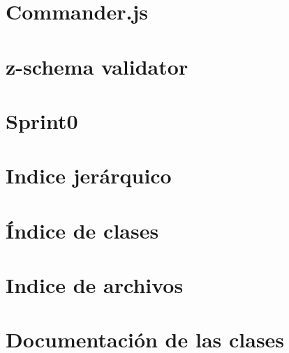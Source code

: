 \documentclass[twoside]{book}
\newcommand{\+}{\discretionary{\mbox{\scriptsize$\hookleftarrow$}}{}{}}
\begin{document}
\chapter{Commander.\+js}
\label{md_Backend_nodejs_node_modules_z_schema_node_modules_commander_Readme}

\chapter{z-\/schema validator}
\label{md_Backend_nodejs_node_modules_z_schema_README}

\chapter{Sprint0}
\label{md_Backend_README}

\chapter{Indice jerárquico}

\chapter{Índice de clases}

\chapter{Indice de archivos}

\chapter{Documentación de las clases}
















\end{document}

